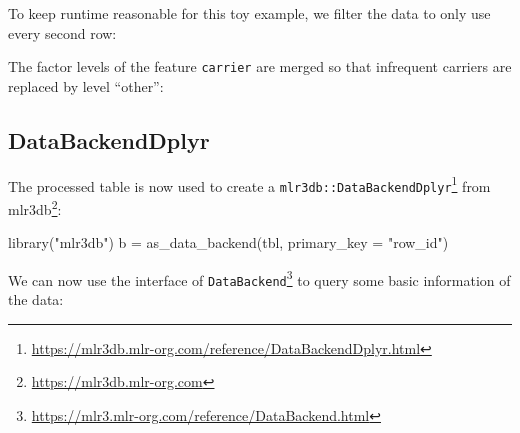 \documentclass[12pt,]{scrbook}
\newenvironment{Shaded}{}{}
\newcommand{\DataTypeTok}[1]{#1}
\newcommand{\DecValTok}[1]{#1}
\newcommand{\KeywordTok}[1]{\textcolor[rgb]{0.00,0.00,1.00}{#1}}
\newcommand{\NormalTok}[1]{#1}
\newcommand{\OperatorTok}[1]{#1}
\newcommand{\OtherTok}[1]{\textcolor[rgb]{1.00,0.25,0.00}{#1}}
\newcommand{\StringTok}[1]{\textcolor[rgb]{0.00,0.50,0.50}{#1}}
\renewcommand{\href}[2]{#2\footnote{\url{#1}}}
\begin{document}
To keep runtime reasonable for this toy example, we filter the data to only use every second row:

\begin{Shaded}
\end{Shaded}

The factor levels of the feature \texttt{carrier} are merged so that infrequent carriers are replaced by level ``other'':

\begin{Shaded}
\end{Shaded}

\hypertarget{databackenddplyr}{%
\subsection{DataBackendDplyr}\label{databackenddplyr}}

The processed table is now used to create a \href{https://mlr3db.mlr-org.com/reference/DataBackendDplyr.html}{\texttt{mlr3db::DataBackendDplyr}} from \href{https://mlr3db.mlr-org.com}{mlr3db}:

\begin{Shaded}
\begin{Highlighting}[]
\KeywordTok{library}\NormalTok{(}\StringTok{"mlr3db"}\NormalTok{)}
\NormalTok{b =}\StringTok{ }\KeywordTok{as_data_backend}\NormalTok{(tbl, }\DataTypeTok{primary_key =} \StringTok{"row_id"}\NormalTok{)}
\end{Highlighting}
\end{Shaded}

We can now use the interface of \href{https://mlr3.mlr-org.com/reference/DataBackend.html}{\texttt{DataBackend}} to query some basic information of the data:
\end{document}
